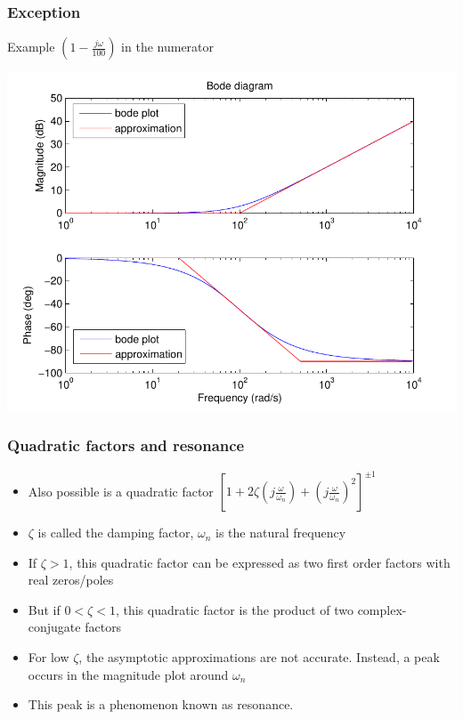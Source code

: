 \begin{frame}
\frametitle{Exception}
Example $(1 - \frac{j\omega}{100})$ in the numerator

\begin{center}
\includegraphics[scale=0.5]{BodeException}
\end{center}

\end{frame}


\begin{frame}
\frametitle{Quadratic factors and resonance}
\begin{itemize}
\item Also possible is a quadratic factor $[1 + 2\zeta(j\frac{\omega}{\omega_n}) +  (j\frac{\omega}{\omega_n})^2]^{\pm1}$
\item $\zeta$ is called the damping factor, $\omega_n$ is the natural frequency
\item If $\zeta > 1$, this quadratic factor can be expressed as two first order factors with real zeros/poles
\item But if $0 < \zeta < 1 $, this quadratic factor is the product of two complex-conjugate factors
\item For low $\zeta$, the asymptotic approximations are not accurate. Instead, a peak occurs in the magnitude plot around $\omega_n$
\item This peak is a phenomenon known as resonance. 
\end{itemize}

\end{frame}


